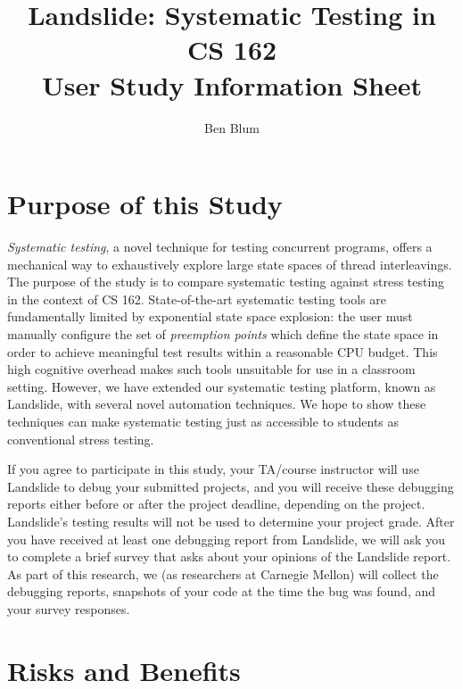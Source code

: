 \documentclass{article}
\begin{document}

\newcommand\classname{CS 162}
\title{\bf Landslide: Systematic Testing in \classname \\ User Study Information Sheet}
\author{Ben Blum}
\date{}
\maketitle

\section{Purpose of this Study}

{\em Systematic testing}, a novel technique for testing concurrent programs, offers a mechanical way to exhaustively explore large state spaces of thread interleavings.
The purpose of the study is to compare systematic testing against stress testing in the context of \classname.
State-of-the-art systematic testing tools are fundamentally limited by exponential state space explosion: the user must manually configure the set of {\em preemption points} which define the state space in order to achieve meaningful test results within a reasonable CPU budget.
This high cognitive overhead makes such tools unsuitable for use in a classroom setting.
However, we have extended our systematic testing platform, known as Landslide, with several novel automation techniques.
We hope to show these techniques can make systematic testing just as accessible to students as conventional stress testing.

If you agree to participate in this study, your TA/course instructor will use Landslide to debug your submitted projects, and you will receive these debugging reports either before or after the project deadline, depending on the project.
Landslide's testing results will not be used to determine your project grade.
After you have received at least one debugging report from Landslide, we will ask you to complete a brief survey that asks about your opinions of the Landslide report.
As part of this research, we (as researchers at Carnegie Mellon) will collect the debugging reports, snapshots of your code at the time the bug was found, and your survey responses.

\section{Risks and Benefits}
\end{document}
